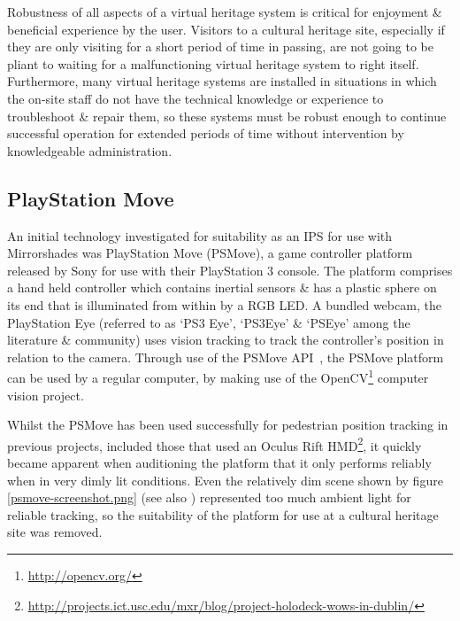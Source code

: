 Robustness of all aspects of a virtual heritage system is critical for enjoyment \& beneficial experience by the user. Visitors to a cultural heritage site, especially if they are only visiting for a short period of time in passing, are not going to be pliant to waiting for a malfunctioning virtual heritage system to right itself. Furthermore, many virtual heritage systems are installed in situations in which the on-site staff do not have the technical knowledge or experience to troubleshoot \& repair them, so these systems must be robust enough to continue successful operation for extended periods of time without intervention by knowledgeable administration.



\subsection{PlayStation Move}

An initial technology investigated for suitability as an IPS for use with Mirrorshades was PlayStation Move (PSMove), a game controller platform released by Sony for use with their PlayStation 3 console. The platform comprises a hand held controller which contains inertial sensors \& has a plastic sphere on its end that is illuminated from within by a RGB LED. A bundled webcam, the PlayStation Eye (referred to as `PS3 Eye', `PS3Eye' \& `PSEye' among the literature \& community) uses vision tracking to track the controller's position in relation to the camera. Through use of the PSMove API~\cite{Perl2012}, the PSMove platform can be used by a regular computer, by making use of the OpenCV\footnote{\url{http://opencv.org/}} computer vision project.

Whilst the PSMove has been used successfully for pedestrian position tracking in previous projects, included those that used an Oculus Rift HMD\footnote{\url{http://projects.ict.usc.edu/mxr/blog/project-holodeck-wows-in-dublin/}}, it quickly became apparent when auditioning the platform that it only performs reliably when in very dimly lit conditions. Even the relatively dim scene shown by figure \ref{psmove-screenshot.png} (see also ) represented too much ambient light for reliable tracking, so the suitability of the platform for use at a cultural heritage site was removed.

